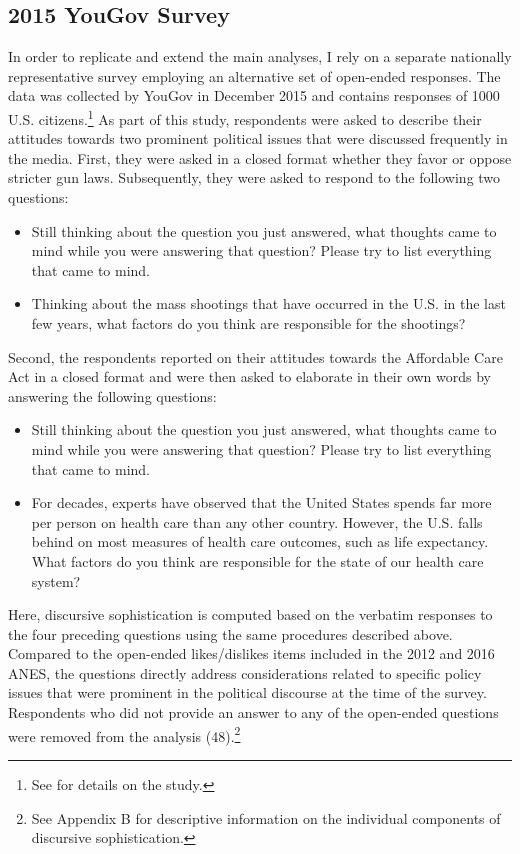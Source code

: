 \documentclass[12pt]{article}
\begin{document}
\subsection*{2015 YouGov Survey}
In order to replicate and extend the main analyses, I rely on a separate nationally representative survey employing an alternative set of open-ended responses. The data was collected by YouGov in December 2015 and contains responses of 1000 U.S. citizens.\footnote{See \citet{clifford2016cheating} for details on the study.} As part of this study, respondents were asked to describe their attitudes towards two prominent political issues that were discussed frequently in the media. First, they were asked in a closed format whether they favor or oppose stricter gun laws. Subsequently, they were asked to respond to the following two questions:
\begin{itemize}\setlength\itemsep{0em}
\item Still thinking about the question you just answered, what thoughts came to mind while you were answering that question? Please try to list everything that came to mind.
\item Thinking about the mass shootings that have occurred in the U.S. in the last few years, what factors do you think are responsible for the shootings?
\end{itemize}
Second, the respondents reported on their attitudes towards the Affordable Care Act in a closed format and were then asked to elaborate in their own words by answering the following questions:
\begin{itemize}\setlength\itemsep{0em}
\item Still thinking about the question you just answered, what thoughts came to mind while you were answering that question? Please try to list everything that came to mind.
\item For decades, experts have observed that the United States spends far more per person on health care than any other country. However, the U.S. falls behind on most measures of health care outcomes, such as life expectancy. What factors do you think are responsible for the state of our health care system?
\end{itemize}
Here, discursive sophistication is computed based on the verbatim responses to the four preceding questions using the same procedures described above. Compared to the open-ended likes/dislikes items included in the 2012 and 2016 ANES, the questions directly address considerations related to specific policy issues that were prominent in the political discourse at the time of the survey. Respondents who did not provide an answer to any of the open-ended questions were removed from the analysis (48).\footnote{See Appendix B for descriptive information on the individual components of discursive sophistication.}
\end{document}
